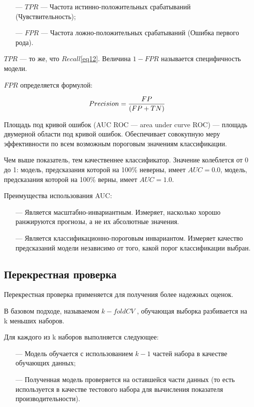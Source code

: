 \begin{itemize}
    \item[—] $TPR$ — Частота истинно-положительных срабатываний (Чувствительность);
    \item[—] $FPR$ — Частота ложно-положительных срабатываний (Ошибка первого рода).
\end{itemize}

$TPR$ — то же, что $Recall$\eqref{eq12}.
Величина $1 - FPR$ называется специфичность модели.

$FPR$ определяется формулой:

\begin{equation}\label{eq18}
    Precision = {{FP} \over{(FP + TN)}}
\end{equation}

Площадь под кривой ошибок (AUC ROC — area under curve ROC) — площадь двумерной области под  
кривой ошибок. Обеспечивает совокупную меру эффективности по всем возможным пороговым значениям классификации.

Чем выше показатель, тем качественнее классификатор. Значение колеблется от 0 до 1: модель, предсказания которой на 
100\% неверны, имеет $AUC=0.0$, модель, предсказания которой на 100\% верны, имеет $AUC=1.0$.

Преимущества использования AUC:

\begin{itemize}
    \item[—] Является масштабно-инвариантным. Измеряет, насколько хорошо ранжируются прогнозы, а не их абсолютные значения.
    \item[—] Является классификационно-пороговым инвариантом. Измеряет качество предсказаний модели независимо от того, 
    какой порог классификации выбран.
\end{itemize}


\subsection{Перекрестная проверка}

Перекрестная проверка применяется для получения более надежных оценок.

В базовом подходе, называемом $k-fold CV$ \cite{scikitKFold}, 
обучающая выборка разбивается на k меньших наборов. 

Для каждого из k наборов выполняется следующее:

\begin{itemize}
    \item[—] Модель обучается с использованием $k - 1$ частей набора в качестве обучающих данных;
    \item[—] Полученная модель проверяется на оставшейся части данных (то есть используется в качестве тестового набора для вычисления 
показателя производительности).
\end{itemize}

